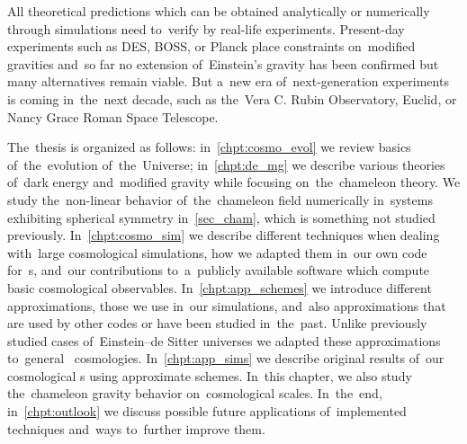 All theoretical predictions which can be obtained analytically or numerically through simulations need to~verify by real-life experiments. Present-day experiments such as DES, BOSS, or Planck place constraints on~modified gravities and~so far no extension of~Einstein's gravity has been confirmed but many alternatives remain viable. But a~new era of~next-generation experiments is coming in~the~next decade, such as the~Vera C. Rubin Observatory, Euclid, or Nancy Grace Roman Space Telescope.


The~thesis is organized as follows: in~\autoref{chpt:cosmo_evol} we review basics of~the~evolution of~the~Universe; in~\autoref{chpt:de_mg} we describe various theories of~dark energy and~modified gravity while focusing on~the~chameleon theory. We study the~non-linear behavior of~the~chameleon field numerically in~systems exhibiting spherical symmetry in~\autoref{sec_cham}, which is something not studied previously. In~\autoref{chpt:cosmo_sim} we describe different techniques when dealing with~large cosmological simulations, how we adapted them in~our own code for~\nbodysim s, and~our contributions to~a~publicly available software  which compute basic cosmological observables. In~\autoref{chpt:app_schemes} we introduce different approximations, those we use in~our simulations, and~also approximations that are used by other codes or have been studied in~the~past. Unlike previously studied cases of~Einstein--de Sitter universes we adapted these approximations to~general \LCDM\ cosmologies. In~\autoref{chpt:app_sims} we describe original results of~our cosmological \nbodysim s using approximate schemes. In~this chapter, we also study the~chameleon gravity behavior on~cosmological scales. 
In~the~end, in~\autoref{chpt:outlook} we discuss possible future applications of~implemented techniques and~ways to~further improve them.

